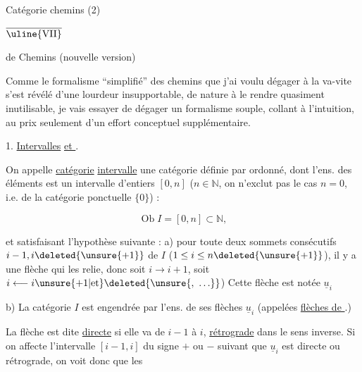 Catégorie  chemins (2)

$\overline{\text{\uline{VII}}}$



 de Chemins (nouvelle version)

Comme le formalisme ``simplifié'' des chemins que j'ai voulu dégager à la va-vite s'est révélé d'une lourdeur insupportable, de nature à le rendre quasiment inutilisable, je vais essayer de dégager un formalisme souple, collant à l'intuition, au prix seulement d'un effort conceptuel supplémentaire.

1. \uline{Intervalles} \uline{et  }.

On appelle \uline{catégorie} \uline{intervalle} \uline{} une catégorie définie par   ordonné, dont l'ens. des éléments est un intervalle d'entiers $[0,n]$ ($n\in\mathbb{N}$, on n'exclut pas le cas $n=0$, i.e. de la catégorie ponctuelle $\{0\}$) :

\[\operatorname{Ob}I=[0,n]\subset\mathbb{N},\]

 et satisfaisant l'hypothèse suivante : a) pour toute    deux sommets consécutifs $i-1,i\deleted{\unsure{+1}}$ de $I$ ($1\leq i\leq n\deleted{\unsure{+1}}$), il y a une flèche qui les relie, donc soit $i\longrightarrow i+1$, soit $i\longleftarrow i\unsure{+1|\text{et}}\deleted{\unsure{,\ \ldots}}$) Cette flèche est notée $\underline{u}_i$


b) La catégorie $I$ est engendrée par l'ens. de ses flèches $\underline{u}_i$ (appelées \uline{flèches de }.)

 La flèche   est dite \uline{directe} si elle va de $i-1$ à $i$, \uline{rétrograde} dans le sens inverse. Si on affecte l'intervalle $[i-1,i]$ du signe $+$ ou $-$ suivant que $\underline{u}_i$ est directe ou rétrograde, on voit donc que les

